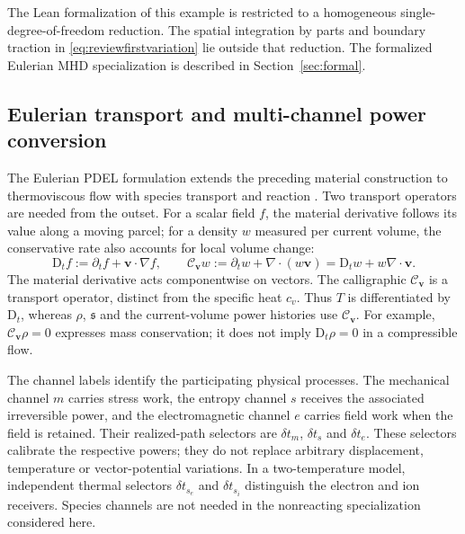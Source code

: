 \documentclass[11pt,a4paper]{article}
\theoremstyle{remark}\newtheorem{remark}{Remark}
\numberwithin{equation}{section}
\newcommand{\vv}{\boldsymbol v}
\newcommand{\grad}{\nabla}
\newcommand{\diver}{\nabla\!\cdot}
\newcommand{\Dt}{\mathrm D_t}
\newcommand{\Cv}{\mathcal C_{\vv}}
\newcommand{\st}{\mathfrak s}
\begin{document}
The Lean formalization of this example is restricted to a homogeneous single-degree-of-freedom reduction. The spatial integration by parts and boundary traction in \eqref{eq:reviewfirstvariation} lie outside that reduction. The formalized Eulerian MHD specialization is described in Section~\ref{sec:formal}.

\subsection{Eulerian transport and multi-channel power conversion}
The Eulerian PDEL formulation extends the preceding material construction to thermoviscous flow with species transport and reaction \citep{RenEulerian}. Two transport operators are needed from the outset. For a scalar field $f$, the material derivative follows its value along a moving parcel; for a density $w$ measured per current volume, the conservative rate also accounts for local volume change:
\begin{equation}
\Dt f:=\partial_t f+\vv\cdot\grad f,\qquad
\Cv w:=\partial_t w+\diver(w\vv)
=\Dt w+w\diver\vv.
\label{eq:reviewrates}
\end{equation}
The material derivative acts componentwise on vectors. The calligraphic $\Cv$ is a transport operator, distinct from the specific heat $c_v$. Thus $T$ is differentiated by $\Dt$, whereas $\rho$, $\st$ and the current-volume power histories use $\Cv$. For example, $\Cv\rho=0$ expresses mass conservation; it does not imply $\Dt\rho=0$ in a compressible flow.

The channel labels identify the participating physical processes. The mechanical channel $m$ carries stress work, the entropy channel $s$ receives the associated irreversible power, and the electromagnetic channel $e$ carries field work when the field is retained. Their realized-path selectors are $\delta t_m$, $\delta t_s$ and $\delta t_e$. These selectors calibrate the respective powers; they do not replace arbitrary displacement, temperature or vector-potential variations. In a two-temperature model, independent thermal selectors $\delta t_{s_e}$ and $\delta t_{s_i}$ distinguish the electron and ion receivers. Species channels are not needed in the nonreacting specialization considered here.
\end{document}
